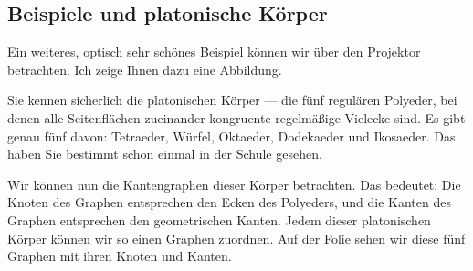 \begin{math-stroke}
\begin{center}
\end{center}
\end{math-stroke}

\subsection{Beispiele und platonische Körper}

\begin{spoken-clean}[00:35:22 - 00:36:46]
Ein weiteres, optisch sehr schönes Beispiel können wir über den Projektor betrachten. Ich zeige Ihnen dazu eine Abbildung. 

Sie kennen sicherlich die platonischen Körper --- die fünf regulären Polyeder, bei denen alle Seitenflächen zueinander kongruente regelmäßige Vielecke sind. Es gibt genau fünf davon: Tetraeder, Würfel, Oktaeder, Dodekaeder und Ikosaeder. Das haben Sie bestimmt schon einmal in der Schule gesehen.

Wir können nun die Kantengraphen dieser Körper betrachten. Das bedeutet: Die Knoten des Graphen entsprechen den Ecken des Polyeders, und die Kanten des Graphen entsprechen den geometrischen Kanten. Jedem dieser platonischen Körper können wir so einen Graphen zuordnen. Auf der Folie sehen wir diese fünf Graphen mit ihren Knoten und Kanten.
\end{spoken-clean}

